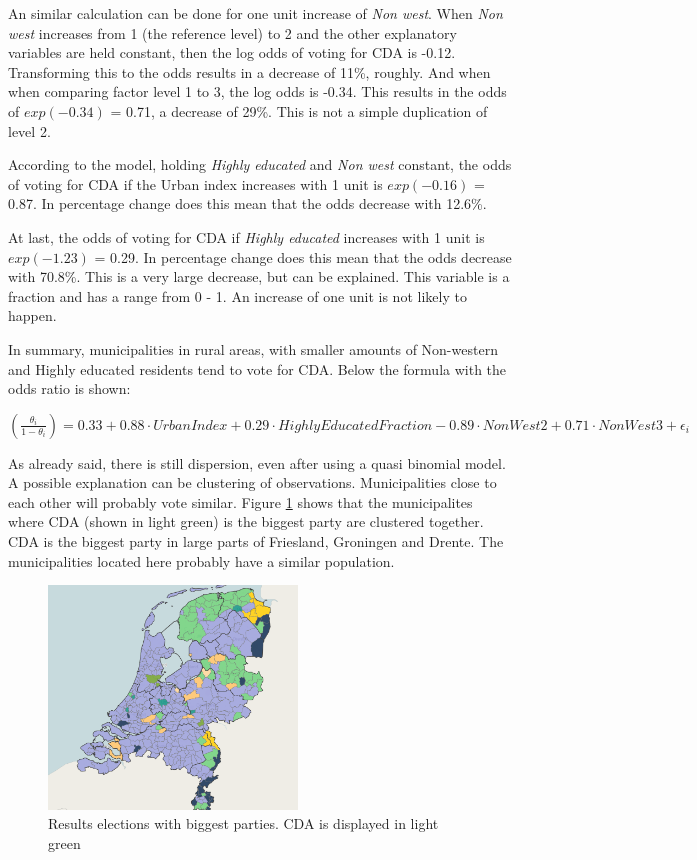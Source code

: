 \documentclass[11pt,]{article}
\begin{document}
An similar calculation can be done for one unit increase of \emph{Non
west}. When \emph{Non west} increases from 1 (the reference level) to 2
and the other explanatory variables are held constant, then the log odds
of voting for CDA is -0.12. Transforming this to the odds results in a
decrease of 11\%, roughly. And when when comparing factor level 1 to 3,
the log odds is -0.34. This results in the odds of \(exp(-0.34)\) =
0.71, a decrease of 29\%. This is not a simple duplication of level 2.

According to the model, holding \emph{Highly educated} and \emph{Non
west} constant, the odds of voting for CDA if the Urban index increases
with 1 unit is \(exp(-0.16)\) = 0.87. In percentage change does this
mean that the odds decrease with 12.6\%.

At last, the odds of voting for CDA if \emph{Highly educated} increases
with 1 unit is \(exp(-1.23)\) = 0.29. In percentage change does this
mean that the odds decrease with 70.8\%. This is a very large decrease,
but can be explained. This variable is a fraction and has a range from 0
- 1. An increase of one unit is not likely to happen.

In summary, municipalities in rural areas, with smaller amounts of
Non-western and Highly educated residents tend to vote for CDA. Below
the formula with the odds ratio is shown:

\((\frac{\theta_i}{1 - \theta_i}) = 0.33 + 0.88 \cdot UrbanIndex + 0.29 \cdot HighlyEducatedFraction - 0.89 \cdot NonWest2 + 0.71 \cdot NonWest3 + \epsilon_i\)

As already said, there is still dispersion, even after using a quasi
binomial model. A possible explanation can be clustering of
observations. Municipalities close to each other will probably vote
similar. Figure \ref{Results elections} shows that the municipalites
where CDA (shown in light green) is the biggest party are clustered
together. CDA is the biggest party in large parts of Friesland,
Groningen and Drente. The municipalities located here probably have a
similar population.

\begin{figure}
\centering
\includegraphics[width=2.60417in]{Uitslag_verkiezingen2017.png}
\caption{\label{Results elections}Results elections with biggest
parties. CDA is displayed in light green}
\end{figure}
\end{document}
